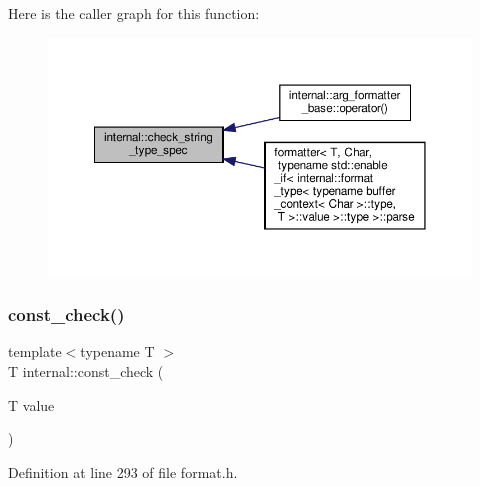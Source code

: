 Here is the caller graph for this function\+:
\nopagebreak
\begin{figure}[H]
\begin{center}
\leavevmode
\includegraphics[width=350pt]{namespaceinternal_a3720624d15e22355851c82f9f2166c5a_icgraph}
\end{center}
\end{figure}
\mbox{\label{namespaceinternal_ab4bd4ce115d79a68ea0f8f03e6cf8988}} 
\subsubsection{\texorpdfstring{const\+\_\+check()}{const\_check()}}
{\footnotesize\ttfamily template$<$typename T $>$ \\
T internal\+::const\+\_\+check (\begin{DoxyParamCaption}\item[{T}]{value }\end{DoxyParamCaption})\hspace{0.3cm}{\ttfamily [inline]}}



Definition at line 293 of file format.\+h.

